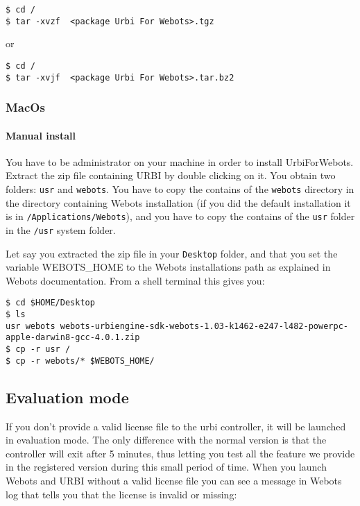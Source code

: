 \begin{lstlisting}
$ cd /
$ tar -xvzf  <package Urbi For Webots>.tgz
\end{lstlisting}
     or

\begin{lstlisting}
$ cd /
$ tar -xvjf  <package Urbi For Webots>.tar.bz2
\end{lstlisting}

\subsubsection{MacOs}
\label{webots.setup.macos}%

\paragraph{Manual install}
\label{webots.setup.macos.manual}%

You have to be administrator on your machine in order to install
UrbiForWebots.  Extract the zip file containing URBI by double
clicking on it.  You obtain two folders: \nolinkurl{usr} and
\nolinkurl{webots}.  You have to copy the contains of the
\nolinkurl{webots} directory in the directory containing Webots
installation (if you did the default installation it is in
\nolinkurl{/Applications/Webots}), and you have to copy the contains
of the \nolinkurl{usr} folder in the \nolinkurl{/usr} system folder.


Let say you extracted the zip file in your \nolinkurl{Desktop} folder,
and that you set the variable WEBOTS\_HOME to the Webots installations
path as explained in Webots documentation.  From a shell terminal this
gives you:


\begin{lstlisting}
$ cd $HOME/Desktop
$ ls
usr webots webots-urbiengine-sdk-webots-1.03-k1462-e247-l482-powerpc-apple-darwin8-gcc-4.0.1.zip
$ cp -r usr /
$ cp -r webots/* $WEBOTS_HOME/
\end{lstlisting}

\subsection{Evaluation mode}
\label{webots.evaluation}%

If you don't provide a valid license file to the urbi controller, it
will be launched in evaluation mode. The only difference with the
normal version is that the controller will exit after 5 minutes, thus
letting you test all the feature we provide in the registered version
during this small period of time. When you launch Webots and URBI
without a valid license file you can see a message in Webots log that
tells you that the license is invalid or missing:


